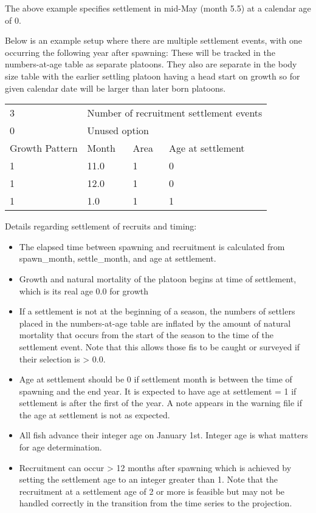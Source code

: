 The above example specifies settlement in mid-May (month 5.5) at a calendar age of 0. 

Below is an example setup where there are multiple settlement events, with one occurring the following year after spawning: These will be tracked in the numbers-at-age table as separate platoons. They also are separate in the body size table with the earlier settling platoon having a head start on growth so for given calendar date will be larger than later born platoons.

\begin{center}
	\begin{tabular}{p{3cm} p{3cm} p{2cm} p{7cm}}
		\hline
		3 & \multicolumn{3}{l}{Number of recruitment settlement events} \Tstrut\\
		0 & \multicolumn{3}{l}{Unused option} \Bstrut\\
		\hline
		Growth Pattern & Month & Area & Age at settlement \Tstrut\Bstrut\\
		\hline
		1 & 11.0 & 1 & 0 \Tstrut\\
		1 & 12.0 & 1 & 0 \\
		1 & 1.0 & 1 & 1 \Bstrut\\
		\hline
	\end{tabular}		
\end{center}

Details regarding settlement of recruits and timing:
	\begin{itemize}
		\item The  elapsed time between spawning and recruitment is calculated from spawn\_month, settle\_month, and age at settlement.
		\item Growth and natural mortality of the platoon begins at time of settlement, which is its real age 0.0 for growth
		\item If a settlement is not at the beginning of a season, the numbers of settlers placed in the numbers-at-age table are inflated by the amount of natural mortality that occurs from the start of the season to the time of the settlement event. Note that this allows those fis to be caught or surveyed if their selection is > 0.0.
		\item Age at settlement should be 0 if settlement month is between the time of spawning and the end year. It is expected to have age at settlement = 1 if settlement is after the first of the year. A note appears in the warning file if the age at settlement is not as expected.
		\item All fish advance their integer age on January 1st. Integer age is what matters for age determination.
		\item Recruitment can occur > 12 months after spawning which is achieved by setting the settlement age to an integer greater than 1. Note that the recruitment at a settlement age of 2 or more is feasible but may not be handled correctly in the transition from the time series to the projection.		
	\end{itemize}


